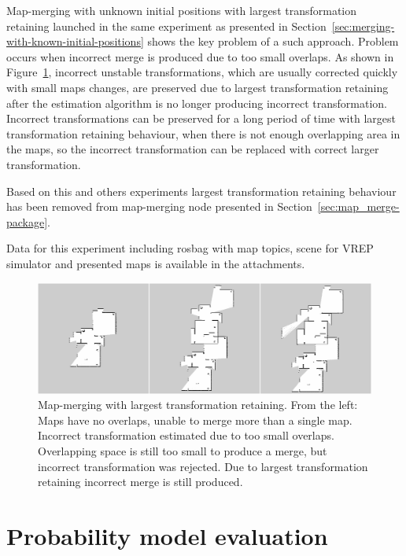Map-merging with unknown initial positions with largest transformation retaining launched in the same experiment as presented in Section~\ref{sec:merging-with-known-initial-positions} shows the key problem of a such approach. Problem occurs when incorrect merge is produced due to too small overlaps. As shown in Figure~\ref{fig:retaining-largest-transformation-montage}, incorrect unstable transformations, which are usually corrected quickly with small maps changes, are preserved due to largest transformation retaining after the estimation algorithm is no longer producing incorrect transformation. Incorrect transformations can be preserved for a long period of time with largest transformation retaining behaviour, when there is not enough overlapping area in the maps, so the incorrect transformation can be replaced with correct larger transformation.

Based on this and others experiments largest transformation retaining behaviour has been removed from map-merging node presented in Section~\ref{sec:map_merge-package}.

Data for this experiment including rosbag with map topics, scene for \gls{VREP} simulator and presented maps is available in the attachments.

\begin{figure}
    \centering
    \includegraphics[width=5.71in]{../img/retaining-largest-transformation-montage.png}
    \caption[Map-merging with largest transformation retaining.]{Map-merging with largest transformation retaining. From the left: Maps have no overlaps, unable to merge more than a single map. Incorrect transformation estimated due to too small overlaps. Overlapping space is still too small to produce a merge, but incorrect transformation was rejected. Due to largest transformation retaining incorrect merge is still produced.}
    \label{fig:retaining-largest-transformation-montage}
\end{figure}

\section{Probability model evaluation}
\label{sec:probability-model-evaluation}

